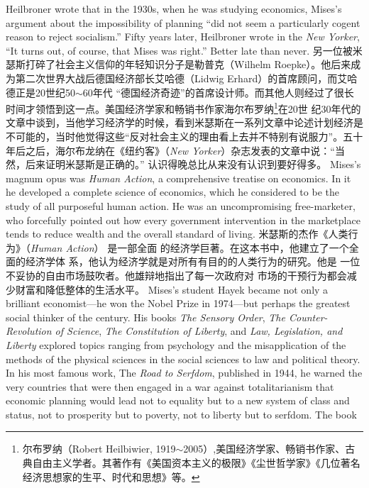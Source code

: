 \begin{paracol}{2}
Heilbroner wrote that in the 1930s, when he was studying economics, Mises's argument about the impossibility of planning
``did not seem a particularly cogent reason to reject socialism.''
Fifty years later, Heilbroner wrote in the \textit{New Yorker}, ``It turns out, of course, that Mises was right.'' Better late than never.
\switchcolumn
另一位被米瑟斯打碎了社会主义信仰的年轻知识分子是勒普克（Wilhelm Roepke）。他后来成为第二次世界大战后德国经济部长艾哈德（Lidwig Erhard）的首席顾问，而艾哈德正是20世纪50$\sim$60年代 “德国经济奇迹”的首席设计师。而其他人则经过了很长时间才领悟到这一点。美国经济学家和畅销书作家海尔布罗纳\footnote{尔布罗纳（Robert Heilbiwier, 1919$\sim$2005）,美国经济学家、畅销书作家、古典自由主义学者。其著作有《美国资本主义的极限》《尘世哲学家》《几位著名经济思想家的生平、时代和思想》等。}在20世 纪30年代的文章中谈到，当他学习经济学的时候，看到米瑟斯在一系列文章中论述计划经济是不可能的，当时他觉得这些“反对社会主义的理由看上去并不特别有说服力”。五十年后之后，海尔布龙纳在《纽约客》（\textit{New Yorker}）杂志发表的文章中说：“当然，后来证明米瑟斯是正确的。” 认识得晚总比从来没有认识到要好得多。
\switchcolumn*
Mises's magnum opus was \textit{Human Action}, a comprehensive
treatise on economics. In it he developed a complete science of
economics, which he considered to be the study of all purposeful human action. He was an uncompromising free-marketer,
who forcefully pointed out how every government intervention
in the marketplace tends to reduce wealth and the overall standard of living.
\switchcolumn
米瑟斯的杰作《人类行为》（\textit{Human  Action}） 是一部全面
的经济学巨著。在这本书中，他建立了一个全面的经济学体
系，他认为经济学就是对所有有目的的人类行为的研究。他是
一位不妥协的自由市场鼓吹者。他雄辩地指出了每一次政府对
市场的干预行为都会减少财富和降低整体的生活水平。
\switchcolumn*
Mises's student Hayek became not only a brilliant economist---he won the Nobel Prize in 1974---but perhaps the
greatest social thinker of the century. His books \textit{The Sensory Order}, \textit{The Counter-Revolution of Science}, \textit{The Constitution of Liberty},
and \textit{Law, Legislation, and Liberty} explored topics ranging from
psychology and the misapplication of the methods of the physical sciences in the social sciences to law and political theory. In
his most famous work, The \textit{Road to Serfdom}, published in 1944,
he warned the very countries that were then engaged in a war
against totalitarianism that economic planning would lead not
to equality but to a new system of class and status, not to prosperity but to poverty, not to liberty but to serfdom. The book

\end{paracol}
